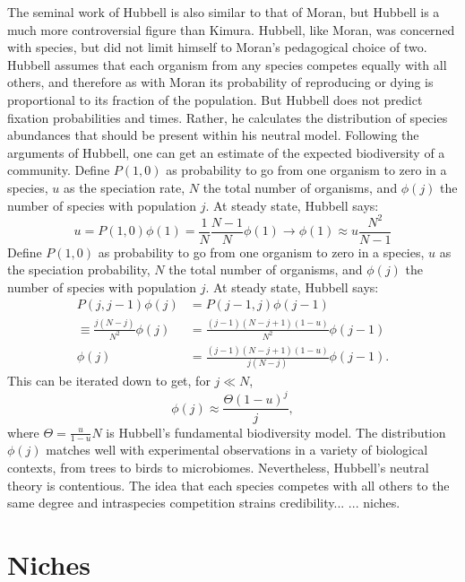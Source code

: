 \documentclass[a4paper,11pt]{article}
\numberwithin{equation}{section} %
\begin{document}
The seminal work of Hubbell \cite{Hubbell2001} is also similar to that of Moran, but Hubbell is a much more controversial figure than Kimura. 
Hubbell, like Moran, was concerned with species, but did not limit himself to Moran's pedagogical choice of two. 
Hubbell assumes that each organism from any species competes equally with all others, and therefore as with Moran its probability of reproducing or dying is proportional to its fraction of the population. 
But Hubbell does not predict fixation probabilities and times. 
Rather, he calculates the distribution of species abundances that should be present within his neutral model. 
Following the arguments of Hubbell, one can get an estimate of the expected biodiversity of a community. 
Define $P(1,0)$ as probability to go from one organism to zero in a species, $u$ as the speciation rate, $N$ the total number of organisms, and $\phi(j)$ the number of species with population $j$. 
At steady state, Hubbell says:
\begin{equation*}
u = P(1,0)\phi(1) = \frac{1}{N}\frac{N-1}{N}\phi(1) \rightarrow \phi(1) \approx u\frac{N^2}{N-1}
\end{equation*}
Define $P(1,0)$ as probability to go from one organism to zero in a species, $u$ as the speciation probability, $N$ the total number of organisms, and $\phi(j)$ the number of species with population $j$. 
At steady state, Hubbell says:
\begin{align*}
                 P(j,j-1)\phi(j) &= P(j-1,j)\phi(j-1) \\
\equiv \frac{j(N-j)}{N^2}\phi(j) &= \frac{(j-1)(N-j+1)(1-u)}{N^2}\phi(j-1) \\
                         \phi(j) &= \frac{(j-1)(N-j+1)(1-u)}{j(N-j)}\phi(j-1).
\end{align*}
This can be iterated down to get, for $j\ll N$,
\begin{equation*}
\phi(j) \approx \frac{\Theta (1-u)^j}{j},
\end{equation*}
where $\Theta = \frac{u}{1-u}N$ is Hubbell's fundamental biodiversity model. 
The distribution $\phi(j)$ matches well with experimental observations in a variety of biological contexts, from trees to birds to microbiomes. 
Nevertheless, Hubbell's neutral theory is contentious. 
The idea that each species competes with all others to the same degree and intraspecies competition strains credibility...
...
niches. 




\section{Niches}
\end{document}

